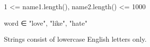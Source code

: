 1 <= name1.length(), name2.length() <= 1000

word ∈ {"love", "like", "hate"}

Strings consist of lowercase English letters only.